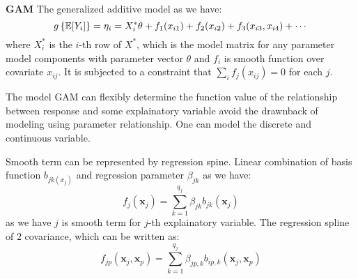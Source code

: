 \begin{definition}{\textbf{GAM}}
   The generalized additive model as we have:
   \begin{equation*}
       g\left\{ \mathbb{E}[Y_i] \right\} = \eta_i = X_i^*\theta + f_1(x_{i1}) + f_2(x_{i2}) + f_3(x_{i3}, x_{i4}) + \cdots
   \end{equation*}
   where $X^*_i$ is the $i$-th row of $X^*$, which is the model matrix for any parameter model components with parameter vector $\theta$ and $f_i$ is smooth function over covariate $x_{ij}$. It is subjected to a constraint that $\sum_if_j(x_{ij}) = 0$ for each $j$.
\end{definition}

\begin{remark}
    The model GAM can flexibly determine the function value of the relationship between response and some explainatory variable avoid the drawnback of modeling using parameter relationship. One can model the discrete and continuous variable. 
\end{remark}

\begin{remark}
    Smooth term can be represented by regression spine. Linear combination of basis function $b_{jk(x_j)}$ and regression parameter $\beta_{jk}$ as we have:
    \begin{equation*}
        f_j(\boldsymbol x_j) = \sum^{q_j}_{k=1}\beta_{jk}b_{jk}(\boldsymbol x_j)
    \end{equation*}
    as we have $j$ is smooth term for $j$-th explainatory variable. The regression spline of $2$ covariance, which can be written as:
    \begin{equation*}
        f_{jp}(\boldsymbol x_j, \boldsymbol x_p) = \sum^{q_j}_{k=1} \beta_{jp,k}b_{ip,k}(\boldsymbol x_j, \boldsymbol x_p)
    \end{equation*}
\end{remark}

